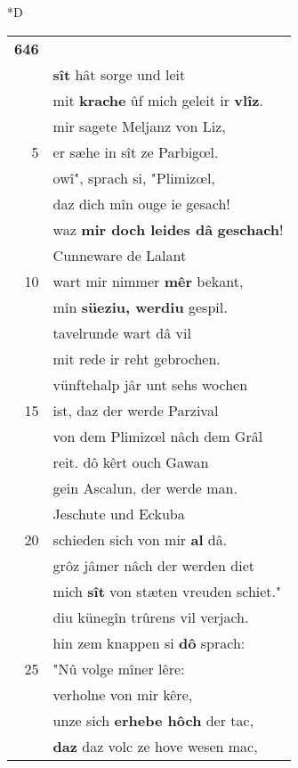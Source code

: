 \documentclass[8pt,a4paper,notitlepage]{article}
\begin{document}
\begin{table}[ht]
\begin{minipage}[t]{0.5\linewidth}
\small
\begin{center}*D
\end{center}
\begin{tabular}{rl}
\textbf{646} & \textbf{\textit{\begin{large}D\end{large}}az} Gawan von Artuse reit,\\ 
 & \textbf{sît} hât sorge und leit\\ 
 & mit \textbf{krache} ûf mich geleit ir \textbf{vlîz}.\\ 
 & mir sagete Meljanz von Liz,\\ 
5 & er sæhe in sît ze Parbigœl.\\ 
 & owî", sprach si, "Plimizœl,\\ 
 & daz dich mîn ouge ie gesach!\\ 
 & waz \textbf{mir doch leides dâ} \textbf{geschach}!\\ 
 & Cunneware de Lalant\\ 
10 & wart mir nimmer \textbf{mêr} bekant,\\ 
 & mîn \textbf{süeziu, werdiu} gespil.\\ 
 & tavelrunde wart dâ vil\\ 
 & mit rede ir reht gebrochen.\\ 
 & vünftehalp jâr unt sehs wochen\\ 
15 & ist, daz der werde Parzival\\ 
 & von dem Plimizœl nâch dem Grâl\\ 
 & reit. dô kêrt ouch Gawan\\ 
 & gein Ascalun, der werde man.\\ 
 & Jeschute und Eckuba\\ 
20 & schieden sich von mir \textbf{al} dâ.\\ 
 & grôz jâmer nâch der werden diet\\ 
 & mich \textbf{sît} von stæten vreuden schiet."\\ 
 & diu künegîn trûrens vil verjach.\\ 
 & hin zem knappen si \textbf{dô} sprach:\\ 
25 & "Nû volge mîner lêre:\\ 
 & verholne von mir kêre,\\ 
 & unze sich \textbf{erhebe hôch} der tac,\\ 
 & \textbf{daz} daz volc ze hove wesen mac,\\ 

\end{tabular}
\end{minipage}
\end{table}
\end{document}
